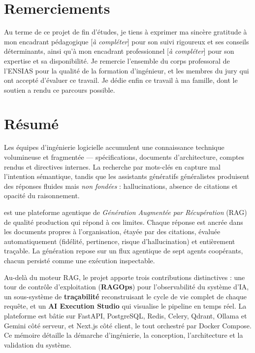 \chapter*{Remerciements}

Au terme de ce projet de fin d'études, je tiens à exprimer ma sincère gratitude
à mon encadrant pédagogique [\textit{à compléter}] pour son suivi rigoureux et
ses conseils déterminants, ainsi qu'à mon encadrant professionnel
[\textit{à compléter}] pour son expertise et sa disponibilité. Je remercie
l'ensemble du corps professoral de l'ENSIAS pour la qualité de la formation
d'ingénieur, et les membres du jury qui ont accepté d'évaluer ce travail. Je
dédie enfin ce travail à ma famille, dont le soutien a rendu ce parcours possible.

\chapter*{Résumé}

Les équipes d'ingénierie logicielle accumulent une connaissance technique
volumineuse et fragmentée — spécifications, documents d'architecture, comptes
rendus et directives internes. La recherche par mots-clés en capture mal
l'intention sémantique, tandis que les assistants génératifs généralistes
produisent des réponses fluides mais \emph{non fondées} : hallucinations, absence
de citations et opacité du raisonnement.

\devpilot{} est une plateforme agentique de \emph{Génération Augmentée par
Récupération} (RAG) de qualité production qui répond à ces limites. Chaque
réponse est ancrée dans les documents propres à l'organisation, étayée par des
citations, évaluée automatiquement (fidélité, pertinence, risque d'hallucination)
et entièrement traçable. La génération repose sur un flux agentique de sept
agents coopérants, chacun persisté comme une exécution inspectable.

Au-delà du moteur RAG, le projet apporte trois contributions distinctives : une
tour de contrôle d'exploitation (\textbf{RAGOps}) pour l'observabilité du système
d'IA, un sous-système de \textbf{traçabilité} reconstruisant le cycle de vie
complet de chaque requête, et un \textbf{AI Execution Studio} qui visualise le
pipeline en temps réel. La plateforme est bâtie sur FastAPI, PostgreSQL, Redis,
Celery, Qdrant, Ollama et Gemini côté serveur, et Next.js côté client, le tout
orchestré par Docker Compose. Ce mémoire détaille la démarche d'ingénierie, la
conception, l'architecture et la validation du système.

